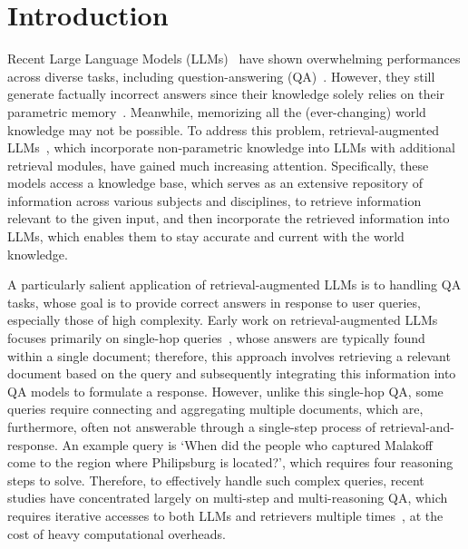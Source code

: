 \section{Introduction}


Recent Large Language Models (LLMs)~\cite{GPT-3, GPT-4, LLaMA2, PaLM2} have shown overwhelming performances across diverse tasks, including question-answering (QA)~\cite{hotpotqa, nq}. However, they still generate factually incorrect answers since their knowledge solely relies on their parametric memory~\cite{RQA, adaptiveRetrieval}. Meanwhile, memorizing all the (ever-changing) world knowledge may not be possible. To address this problem, retrieval-augmented LLMs~\cite{retro, atlas, replug}, which incorporate non-parametric knowledge into LLMs with additional retrieval modules, have gained much increasing attention. Specifically, these models access a knowledge base, which serves as an extensive repository of information across various subjects and disciplines, to retrieve information relevant to the given input, and then incorporate the retrieved information into LLMs, which enables them to stay accurate and current with the world knowledge.






A particularly salient application of retrieval-augmented LLMs is to handling QA tasks, whose goal is to provide correct answers in response to user queries, especially those of high complexity. Early work on retrieval-augmented LLMs focuses primarily on single-hop queries~\cite{internet-QA, ram2023ralm}, whose answers are typically found within a single document; therefore, this approach involves retrieving a relevant document based on the query and subsequently integrating this information into QA models to formulate a response. However, unlike this single-hop QA, some queries require connecting and aggregating multiple documents, which are, furthermore, often not answerable through a single-step process of retrieval-and-response. An example query is `When did the people who captured Malakoff come to the region where Philipsburg is located?', which requires four reasoning steps to solve. Therefore, to effectively handle such complex queries, recent studies have concentrated largely on multi-step and multi-reasoning QA, which requires iterative accesses to both LLMs and retrievers multiple times~\cite{self-ask, ircot}, at the cost of heavy computational overheads.


